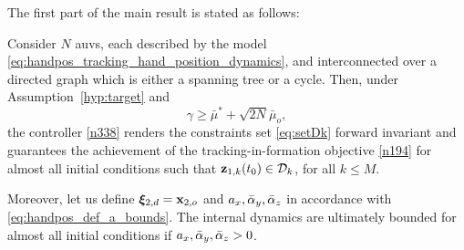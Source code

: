 The first part of the main result is stated as follows:
\begin{prop}\label{thm:USV}
	Consider $N$ \glspl{auv}, each described by the model \eqref{eq:handpos_tracking_hand_position_dynamics}, and interconnected over a directed graph which is either a spanning tree or a cycle.
	Then, under Assumption~\ref{hyp:target} and
	\begin{equation}
		\gamma\geq\bar\mu^*+\sqrt{2N}\bar\mu_o, \label{590}
	\end{equation}
	the controller \eqref{n338} renders the constraints set \eqref{eq:setDk} forward invariant and guarantees the achievement of the tracking-in-formation objective \eqref{n194} for almost all initial conditions such that $\mathbf{z}_{1, k}(t_0)\in\mathcal{D}_k$, for all $k\leq M$.

	Moreover, let us define $\bm{\xi}_{2, d} = \mathbf{x}_{2, o}$ and $a_x, \Bar{\alpha}_y, \Bar{\alpha}_z$ in accordance with \eqref{eq:handpos_def_a_bounds}.
	The internal dynamics are ultimately bounded for almost all initial conditions if $a_x, \Bar{\alpha}_y, \Bar{\alpha}_z > 0$.
\end{prop}


